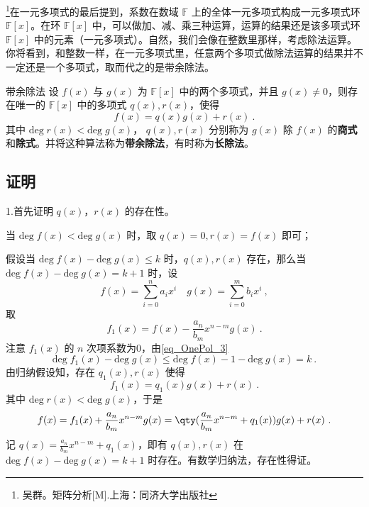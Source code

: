 
\begin{issues}
\end{issues}

\footnote{吴群。矩阵分析[M].上海：同济大学出版社}在一元多项式的最后提到，系数在数域 $\mathbb{F}$ 上的全体一元多项式构成一元多项式环 $\mathbb{F}[x]$。在环 $\mathbb{F}[x]$ 中，可以做加、减、乘三种运算，运算的结果还是该多项式环 $\mathbb{F}[x]$ 中的元素（一元多项式）。自然，我们会像在整数里那样，考虑除法运算。你将看到，和整数一样，在一元多项式里，任意两个多项式做除法运算的结果并不一定还是一个多项式，取而代之的是带余除法。
\begin{theorem}{带余除法}\label{the_DivAlg_1}
设 $f(x)$ 与 $g(x)$ 为 $\mathbb{F}[x]$ 中的两个多项式，并且 $g(x)\neq 0$，则存在唯一的 $\mathbb{F}[x]$ 中的多项式 $q(x),r(x)$，使得
\begin{equation}
f(x)=q(x)g(x)+r(x)~.
\end{equation}
其中 $\mathrm{deg}\;r(x)<\mathrm{deg}\;g(x)$， $q(x),r(x)$ 分别称为 $g(x)$ 除 $f(x)$ 的\textbf{商式}和\textbf{除式}。并将这种算法称为\textbf{带余除法}，有时称为\textbf{长除法}。
\end{theorem}
\subsection{证明}
1.首先证明 $q(x)$，$r(x)$ 的存在性。

当 $\mathrm{deg}\;f(x)<\mathrm{deg}\;g(x)$ 时，取 $q(x)=0,r(x)=f(x)$ 即可；

假设当 $\mathrm{deg}\;f(x)-\mathrm{deg}\;g(x)\leq k$ 时，$q(x),r(x)$ 存在，那么当 $\mathrm{deg}\;f(x)-\mathrm{deg}\;g(x)=k+1$ 时，设
\begin{equation}
f(x)=\sum_{i=0}^n a_i x^i\quad g(x)=\sum_{i=0}^m b_ix^i~,
\end{equation}
取
\begin{equation}
f_1(x)=f(x)-\frac{a_n}{b_m}x^{n-m}g(x)~.
\end{equation}
注意 $f_1(x)$ 的 $n$ 次项系数为0，由\autoref{eq_OnePol_3}~
\begin{equation}
\mathrm{deg}\;f_1(x)-\mathrm{deg}\;g(x)\leq\mathrm{deg}\; f(x)-1-\mathrm{deg}\;g(x)=k~.
\end{equation}
由归纳假设知，存在 $q_1(x),r(x)$ 使得
\begin{equation}
f_1(x)=q_1(x)g(x)+r(x)~.
\end{equation}
其中 $\mathrm{deg}\;r(x)<\mathrm{deg}\;g(x)$，于是
\begin{equation}
f(x)=f_1(x)+\frac{a_n}{b_m}x^{n-m}g(x)=\qty(\frac{a_n}{b_m}x^{n-m}+q_1(x))g(x)+r(x)~.
\end{equation}
记 $q(x)=\frac{a_n}{b_m}x^{n-m}+q_1(x)$，即有 $q(x),r(x)$ 在 $\mathrm{deg}\;f(x)-\mathrm{deg}\;g(x)=k+1$ 时存在。有数学归纳法，存在性得证。

